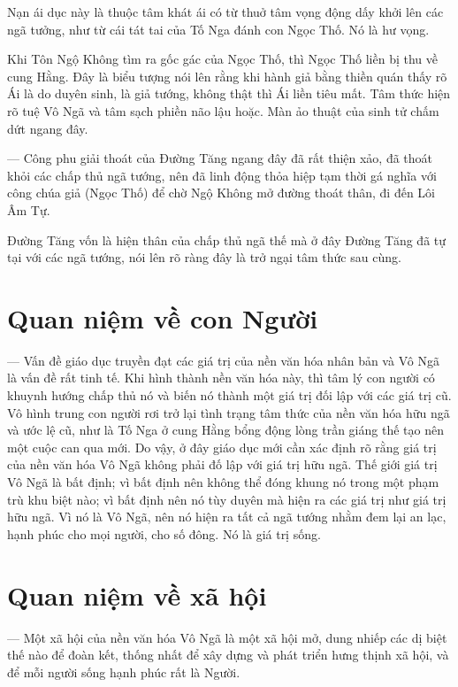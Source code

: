 Nạn ái dục này là thuộc tâm khát ái có từ thuở tâm vọng động dấy khởi lên các ngã tưởng, như từ cái tát tai của Tố Nga đánh con Ngọc Thố. Nó là hư vọng.

Khi Tôn Ngộ Không tìm ra gốc gác của Ngọc Thố, thì Ngọc Thố liền bị thu về cung Hằng. Đây là biểu tượng nói lên rằng khi hành giả bằng thiền quán thấy rõ Ái là do duyên sinh, là giả tướng, không thật thì Ái liền tiêu mất. Tâm thức hiện rõ tuệ Vô Ngã và tâm sạch phiền não lậu hoặc. Màn ảo thuật của sinh tử chấm dứt ngang đây.

— Công phu giải thoát của Đường Tăng ngang đây đã rất thiện xảo, đã thoát khỏi các chấp thủ ngã tướng, nên đã linh động thỏa hiệp tạm thời gá nghĩa với công chúa giả (Ngọc Thố) để chờ Ngộ Không mở đường thoát thân, đi đến Lôi Âm Tự.

Đường Tăng vốn là hiện thân của chấp thủ ngã thế mà ở đây Đường Tăng đã tự tại với các ngã tướng, nói lên rõ ràng đây là trở ngại tâm thức sau cùng.

\section{Quan niệm về con Người} %
\label{sec:91_92_95_con_nguoi}

— Vấn đề giáo dục truyền đạt các giá trị của nền văn hóa nhân bản và Vô Ngã là vấn đề rất tinh tế. Khi hình thành nền văn hóa này, thì tâm lý con người có khuynh hướng chấp thủ nó và biến nó thành một giá trị đối lập với các giá trị cũ. Vô hình trung con người rơi trở lại tình trạng tâm thức của nền văn hóa hữu ngã và ước lệ cũ, như là Tố Nga ở cung Hằng bổng động lòng trần giáng thế tạo nên một cuộc can qua mới. Do vậy, ở đây giáo dục mới cần xác định rõ rằng giá trị của nền văn hóa Vô Ngã không phải đố lập với giá trị hữu ngã. Thế giới giá trị Vô Ngã là bất định; vì bất định nên không thể đóng khung nó trong một phạm trù khu biệt nào; vì bất định nên nó tùy duyên mà hiện ra các giá trị như giá trị hữu ngã. Vì nó là Vô Ngã, nên nó hiện ra tất cả ngã tướng nhằm đem lại an lạc, hạnh phúc cho mọi người, cho số đông. Nó là giá trị sống.

\section{Quan niệm về xã hội} %
\label{sec:91_92_95_xa_hoi}

— Một xã hội của nền văn hóa Vô Ngã là một xã hội mở, dung nhiếp các dị biệt thế nào để đoàn kết, thống nhất để xây dựng và phát triển hưng thịnh xã hội, và để mỗi người sống hạnh phúc rất là Người.


